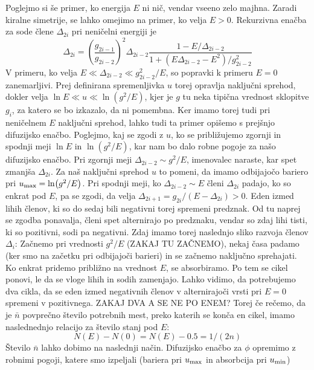 Poglejmo si še primer, ko energija $E$ ni nič, vendar vseeno zelo majhna.
Zaradi kiralne simetrije, se lahko omejimo na primer, ko velja $E > 0$.
Rekurzivna enačba za sode člene $\Delta_{2i}$ pri neničelni energiji je
\begin{equation}
\Delta_{2i} = \left(\frac{g_{2i -1}}{g_{2i-2}} \right)^2 \Delta_{2i-2} \frac{1 - E/\Delta_{2i-2}}{1+ (E \Delta_{2i-2} - E^2)/g_{2i-2}^2}
\end{equation}
V primeru, ko velja $E \ll \Delta_{2i-2} \ll g_{2i-2}^2/E$, so popravki k primeru $E=0$ zanemarljivi. Prej definirana spremenljivka $u$ torej opravlja naključni sprehod, dokler velja
$\ln E \ll u \ll \ln (g^2 / E)$, kjer je $g$ tu neka tipična vrednost sklopitve $g_i$, za katero se bo izkazalo, da ni pomembna. 
Ker imamo torej tudi pri neničelnem $E$ naključni sprehod, lahko tudi ta primer opišemo s prejšnjo difuzijsko enačbo. Poglejmo, kaj se zgodi z $u$, ko se približujemo zgornji in spodnji meji $\ln E$ in $\ln (g^2 / E)$, kar nam bo dalo robne pogoje za našo difuzijsko enačbo.
Pri zgornji meji $\Delta_{2i-2} \sim g^2/E$, imenovalec naraste, kar spet zmanjša $\Delta_{2i}$. Za naš naključni sprehod $u$ to pomeni, da imamo
odbijajočo bariero pri $u_{\textup{max}} = \ln (g^2 / E)$.
Pri spodnji meji, ko $\Delta_{2i-2} \sim E$ členi $\Delta_{2i}$ padajo, ko so enkrat pod $E$, pa se zgodi, da velja 
$\Delta_{2i+1} = g_{2i} / (E - \Delta_{2i}) > 0$. Eden izmed lihih členov, ki so do sedaj bili negativni torej spremeni predznak. Od tu naprej se zgodba ponavalja, členi spet alternirajo po predznaku, vendar so zdaj lihi tisti, ki so pozitivni, sodi pa negativni.
Zdaj imamo torej naslednjo sliko razvoja členov $\Delta_i$: Začnemo pri vrednosti $g^2/E$ (ZAKAJ TU ZAČNEMO), nekaj časa padamo (ker smo na začetku pri odbijajoči barieri) in se začnemo naključno sprehajati.
Ko enkrat pridemo približno na vrednost $E$, se absorbiramo. Po tem se cikel ponovi, le da se vloge lihih in sodih zamenjajo.
Lahko vidimo, da potrebujemo dva cikla, da se eden izmed negativnih členov v alternirajoči vrsti pri $E=0$ spremeni v pozitivnega. ZAKAJ DVA A SE NE PO ENEM? Torej če rečemo, da je $\bar{n}$ povprečno število potrebnih mest, preko katerih se konča en cikel, imamo naslednednjo relacijo za število stanj pod $E$:
\begin{equation}
N(E) - N(0) = N(E) - 0.5 = 1/(2n)
\end{equation}
Število $\bar{n}$ lahko dobimo na naslednji način.
Difuzijsko enačbo za $\phi$ opremimo z robnimi pogoji, katere smo izpeljali (bariera pri $u_{\textup{max}}$ in absorbcija pri $u_{\textup{min}}$)
